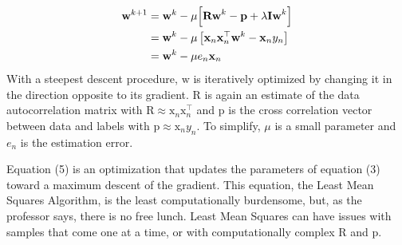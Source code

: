 \documentclass[11pt]{article}
\begin{document}
\begin{tcolorbox}[colback=CrispBlue!5!white,colframe=CrispBlue!75!black,title=2. Work out an iterative solution using the same technique as used in the Least Mean Squares algorithm.]
    \begin{align}
        \bm{\mathrm{w}}^{k+1}&=\bm{\mathrm{w}}^{k}-\mu{\left[\bm{\mathrm{Rw}}^{k}-\bm{\mathrm{p}}+\lambda\bm{\mathrm{Iw}}^{k}\right]}\\
        \notag&=\bm{\mathrm{w}}^{k}-\mu \left[ \bm{\mathrm{x}}_n\bm{\mathrm{x}}_n^\top \bm{\mathrm{w}}^{k} - \bm{\mathrm{x}}_n y_n\right]\\
        &=\bm{\mathrm{w}}^{k}-\mu e_n \bm{\mathrm{x}}_n
    \end{align}
    With a steepest descent procedure, \( \bm{\mathrm {w}} \) is iteratively optimized by changing it in the direction opposite to its gradient. \( \bm{\mathrm{R}}\) is again an estimate of the data autocorrelation matrix with \( \bm{\mathrm{R}} \approx \bm{\mathrm{x}}_n\bm{\mathrm{x}}_n^\top \) and \( \bm{\mathrm{p}} \) is the cross correlation vector between data and labels with \( \bm{\mathrm{p}} \approx \bm{\mathrm{x}}_n y_n \). To simplify, \( \mu \) is a small parameter and \( e_n \) is the estimation error.
\end{tcolorbox}

\begin{tcolorbox}[colback=CrispBlue!5!white,colframe=CrispBlue!75!black,title=3. Comment and compare both solutions in a short conclusion section.]
    Equation (5) is an optimization that updates the parameters of equation (3) toward a maximum descent of the gradient. This equation, the Least Mean Squares Algorithm, is the least computationally burdensome, but, as the professor says, there is no free lunch. Least Mean Squares can have issues with samples that come one at a time, or with computationally complex \( \bm{\mathrm {R}} \) and \( \bm{\mathrm {p}} \).
\end{tcolorbox}
\end{document}
